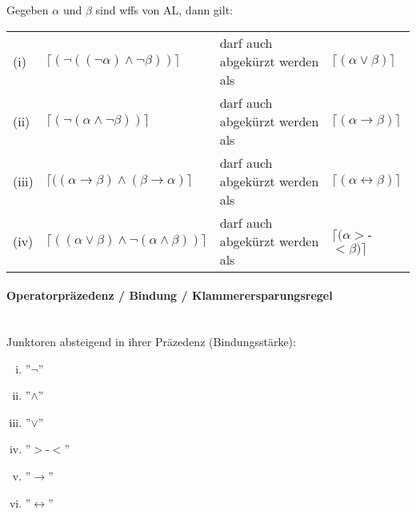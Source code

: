 \documentclass{scrartcl}
\begin{document}
Gegeben $ \alpha $ und $ \beta $ sind wffs von AL, dann gilt: \\

\begin{tabularx}{\linewidth}{l l l l}
	(i) & $ \lceil (\neg ((\neg \alpha) \wedge \neg \beta)) \rceil $ & darf auch abgekürzt werden als & $ \lceil (\alpha \vee \beta) \rceil $ \\
	(ii) & $ \lceil (\neg (\alpha \wedge \neg \beta)) \rceil $ & darf auch abgekürzt werden als & $ \lceil (\alpha \rightarrow \beta) \rceil $ \\
	(iii) & $ \lceil ((\alpha \rightarrow \beta) \wedge (\beta \rightarrow \alpha) \rceil $ & darf auch abgekürzt werden als & $ \lceil (\alpha \leftrightarrow \beta) \rceil $ \\
	(iv) & $ \lceil ((\alpha \vee \beta) \wedge \neg (\alpha \wedge \beta)) \rceil $ & darf auch abgekürzt werden als & $ \lceil (\alpha >$-$< \beta) \rceil $
\end{tabularx}

\pagebreak
\paragraph{Operatorpräzedenz / Bindung / Klammerersparungsregel} \mbox{}\\

Junktoren absteigend in ihrer Präzedenz (Bindungsstärke):
\begin{enumerate}[(i)]
	\item ''$ \neg $''
	\item ''$ \wedge $''
	\item ''$ \vee $''
	\item ''$ > $-$ < $''
	\item ''$ \rightarrow $''
	\item ''$ \leftrightarrow $''
\end{enumerate}
\end{document}
